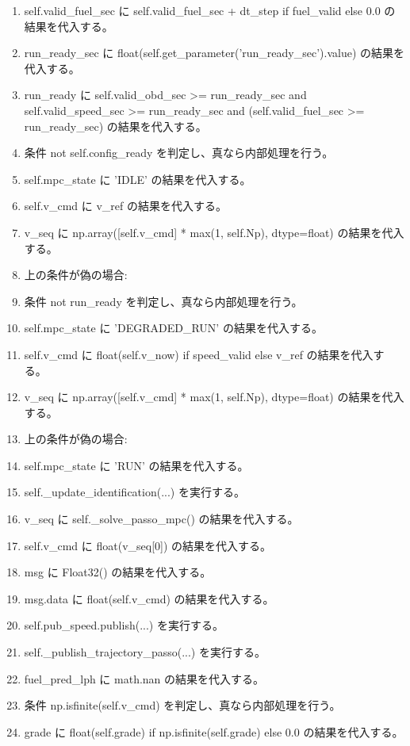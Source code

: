 \documentclass[a4paper,11pt]{article}
\begin{document}
\begin{enumerate}[leftmargin=1.8em]
\item   self.valid\_fuel\_sec に self.valid\_fuel\_sec + dt\_step if fuel\_valid else 0.0 の結果を代入する。
\item run\_ready\_sec に float(self.get\_parameter('run\_ready\_sec').value) の結果を代入する。
\item run\_ready に self.valid\_obd\_sec >= run\_ready\_sec and self.valid\_speed\_sec >= run\_ready\_sec and (self.valid\_fuel\_sec >= run\_ready\_sec) の結果を代入する。
\item 条件 not self.config\_ready を判定し、真なら内部処理を行う。
\item   self.mpc\_state に 'IDLE' の結果を代入する。
\item   self.v\_cmd に v\_ref の結果を代入する。
\item   v\_seq に np.array([self.v\_cmd] * max(1, self.Np), dtype=float) の結果を代入する。
\item   上の条件が偽の場合:
\item   条件 not run\_ready を判定し、真なら内部処理を行う。
\item     self.mpc\_state に 'DEGRADED\_RUN' の結果を代入する。
\item     self.v\_cmd に float(self.v\_now) if speed\_valid else v\_ref の結果を代入する。
\item     v\_seq に np.array([self.v\_cmd] * max(1, self.Np), dtype=float) の結果を代入する。
\item     上の条件が偽の場合:
\item     self.mpc\_state に 'RUN' の結果を代入する。
\item     self.\_update\_identification(...) を実行する。
\item     v\_seq に self.\_solve\_passo\_mpc() の結果を代入する。
\item     self.v\_cmd に float(v\_seq[0]) の結果を代入する。
\item msg に Float32() の結果を代入する。
\item msg.data に float(self.v\_cmd) の結果を代入する。
\item self.pub\_speed.publish(...) を実行する。
\item self.\_publish\_trajectory\_passo(...) を実行する。
\item fuel\_pred\_lph に math.nan の結果を代入する。
\item 条件 np.isfinite(self.v\_cmd) を判定し、真なら内部処理を行う。
\item   grade に float(self.grade) if np.isfinite(self.grade) else 0.0 の結果を代入する。

\end{enumerate}
\end{document}
